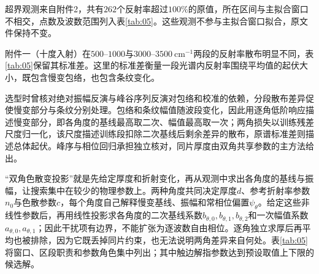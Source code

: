 超界观测来自附件2，共有$262$个反射率超过$100\%$的原值，所在区间与主拟合窗口不相交，点数及波数范围列入表\ref{tab:05}。这些观测不参与主拟合窗口拟合，原文件保持不变。

附件一（十度入射）在$500$--$1000$与$3000$--$3500\ \mathrm{cm}^{-1}$两段的反射率散布明显不同，表\ref{tab:05}保留其标准差。这里的标准差衡量一段光谱内反射率围绕平均值的起伏大小，既包含慢变包络，也包含条纹变化。

选型时曾核对绝对振幅反演与峰谷序列反演对包络和校准的依赖，分段散布差异促使慢变部分与条纹分别处理。包络和条纹幅值随波段变化，因此用逐角低阶响应描述慢变部分，即各角度的基线最高取二次、幅值最高取一次；两角损失以训练残差尺度归一化，该尺度描述训练段扣除二次基线后剩余差异的散布，原谱标准差则描述总体起伏。峰序与相位回归承担独立核对，同片厚度由双角共享参数的主方法给出。

“双角色散变投影”就是先给定厚度和折射变化，再从观测中求出各角度的基线与振幅，让搜索集中在较少的物理参数上。两种角度共同决定厚度$d$、参考折射率参数$n_0$与色散参数$c$，每个角度自己解释慢变基线、振幅和常相位偏置$\psi_\theta$。给定这些非线性参数后，再用线性投影求各角度的二次基线系数$b_{\theta,0},b_{\theta,1},b_{\theta,2}$和一次幅值系数$a_{\theta,0},a_{\theta,1}$；因此干扰项有边界，不能扩张为逐波数自由相位。逐角独立求厚后再平均也被排除，因为它既丢掉同片约束，也无法说明两角差异来自何处。表\ref{tab:05}将窗口、区段职责和参数角色集中列出；其中触边解指参数达到预设取值上下限的候选解。

